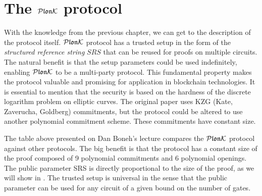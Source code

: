 \chapter{The $\mathcal{P}\mathfrak{lon}\mathcal{K}$ protocol}
\label{chap:3}

With the knowledge from the previous chapter, we can get to the description of the protocol itself. $\mathcal{P}\mathfrak{lon}\mathcal{K}$ protocol has a trusted setup in the form of the \textit{structured reference string} $SRS$ that can be reused for proofs on multiple circuits. The natural benefit is that the setup parameters could be used indefinitely, enabling $\mathcal{P}\mathfrak{lon}\mathcal{K}$ to be a multi-party protocol. This fundamental property makes the protocol valuable and promising for application in blockchain technologies. It is essential to mention that the security is based on the hardness of the discrete logarithm problem on elliptic curves. The original paper uses KZG \cite{KZG} (Kate, Zaverucha, Goldberg) commitments, but the protocol could be altered to use another polynomial commitment scheme. These commitments have constant size. 

\begin{table}[h]
    \centering
    \caption{Comparison of protocols}
\end{table}

The table above presented on Dan Boneh's lecture \cite{Boneh2024} compares the $\mathcal{P}\mathfrak{lon}\mathcal{K}$ protocol against other protocols. The big benefit is that the protocol has a constant size of the proof composed of 9 polynomial commitments and 6 polynomial openings. The public parameter SRS is directly proportional to the size of the proof, as we will show in . The trusted setup is universal in the sense that the public parameter can be used for any circuit of a given bound on the number of gates. 

